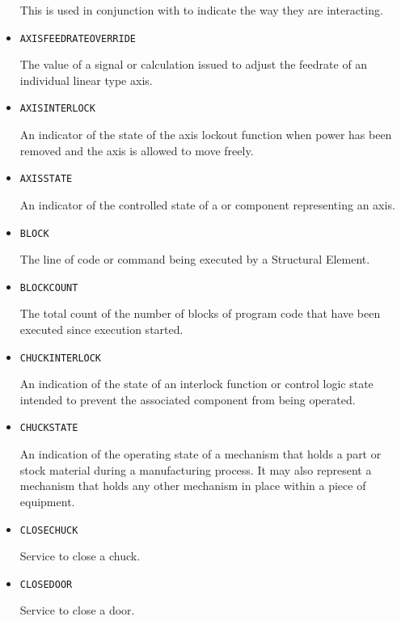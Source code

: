 \begin{itemize}
This is used in conjunction with  to indicate the way they are interacting.


\item \texttt{AXIS\textunderscore FEEDRATE\textunderscore OVERRIDE}  

The value of a signal or calculation issued to adjust the feedrate of an individual linear type axis.


\item \texttt{AXIS\textunderscore INTERLOCK}  

An indicator of the state of the axis lockout function when power has been removed and the axis is allowed to move freely.


\item \texttt{AXIS\textunderscore STATE}  

An indicator of the controlled state of a  or  component representing an axis.


\item \texttt{BLOCK}  

The line of code or command being executed by a  \gls{Structural Element}.


\item \texttt{BLOCK\textunderscore COUNT}  

The total count of the number of blocks of program code that have been executed since execution started.


\item \texttt{CHUCK\textunderscore INTERLOCK}  

An indication of the state of an interlock function or control logic state intended to prevent the associated  component from being operated.


\item \texttt{CHUCK\textunderscore STATE}  

An indication of the operating state of a mechanism that holds a part or stock material during a manufacturing process. It may also represent a mechanism that holds any other mechanism in place within a piece of equipment.


\item \texttt{CLOSE\textunderscore CHUCK}  

Service to close a chuck.


\item \texttt{CLOSE\textunderscore DOOR}  

Service to close a door.



\end{itemize}
